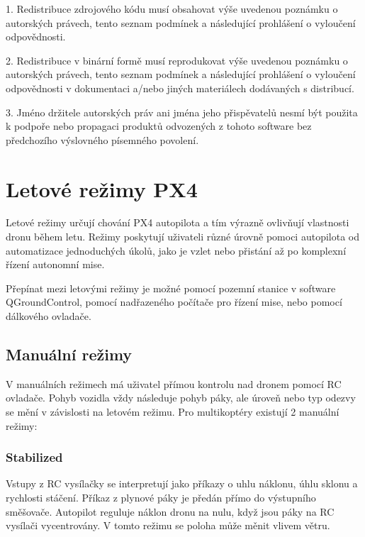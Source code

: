 1. Redistribuce zdrojového kódu musí obsahovat výše uvedenou poznámku o autorských právech, tento seznam podmínek a následující prohlášení o vyloučení odpovědnosti.

2. Redistribuce v binární formě musí reprodukovat výše uvedenou poznámku o autorských právech, tento seznam podmínek a následující prohlášení o vyloučení odpovědnosti v dokumentaci a/nebo jiných materiálech dodávaných s distribucí.

3. Jméno držitele autorských práv ani jména jeho přispěvatelů nesmí být použita k podpoře nebo propagaci produktů odvozených z tohoto software bez předchozího výslovného písemného povolení.

\section{Letové režimy PX4}
\label{sec:letRez}

Letové režimy určují chování PX4 autopilota a tím výrazně ovlivňují vlastnosti dronu během letu. Režimy poskytují uživateli různé úrovně pomoci autopilota od automatizace jednoduchých úkolů, jako je vzlet nebo přistání až po komplexní řízení autonomní mise.

Přepínat mezi letovými režimy je možné pomocí pozemní stanice v software QGroundControl, pomocí nadřazeného počítače pro řízení mise, nebo pomocí dálkového ovladače. \cite{PX4docs} %

\subsection{Manuální režimy}

V manuálních režimech má uživatel přímou kontrolu nad dronem pomocí RC ovladače. Pohyb vozidla vždy následuje pohyb páky, ale úroveň nebo typ odezvy se mění v závislosti na letovém režimu. Pro multikoptéry existují 2 manuální režimy:

\subsubsection{Stabilized}

Vstupy z RC vysílačky se interpretují jako příkazy o uhlu náklonu, úhlu sklonu a rychlosti stáčení. Příkaz z plynové páky je předán přímo do výstupního směšovače. Autopilot reguluje náklon dronu na nulu, když jsou páky na RC vysílači vycentrovány. V tomto režimu se poloha může měnit vlivem větru.

